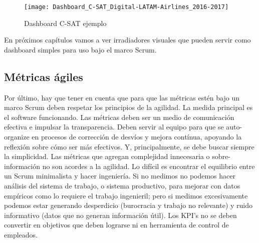   \begin{figure}[h]
  \centering
  \texttt{[image: Dashboard\_C-SAT\_Digital-LATAM-Airlines\_2016-2017]}
  \caption{Dashboard C-SAT ejemplo}
  \centering
  \label{fig:Dashboard_C-SAT_Digital-LATAM-Airlines_2016-2017} %
  \end{figure}
  \FloatBarrier
  
En próximos capítulos vamos a ver irradiadores visuales que pueden servir como dashboard simples para uso bajo el marco Scrum.

\subsection{Métricas ágiles}

Por último, hay que tener en cuenta que para que las métricas estén bajo un marco Scrum deben respetar los principios de la agilidad. La medida principal es el software funcionando. Las métricas deben ser un medio de comunicación efectiva e impulsar la transparencia. Deben servir al equipo para que se auto-organize en procesos de corrección de desvíos y mejora contínua, apoyando la reflexión sobre cómo ser más efectivos. Y, principalmente, se debe buscar siempre la simplicidad. Las métricas que agregan complejidad innecesaria o sobre-información no son acordes a la agilidad. Lo difícil es encontrar el equilibrio entre un Scrum minimalista y hacer ingeniería. Si no medimos no podemos hacer análisis del sistema de trabajo, o sistema productivo, para mejorar con datos empíricos como lo requiere el trabajo ingenieril; pero si medimos excesivamente podemos estar generando desperdicio (burocracia y trabajo no relevante) y ruido informativo (datos que no generan información útil). Los KPI's no se deben convertir en objetivos que deben lograrse ni en herramienta de control de empleados.
